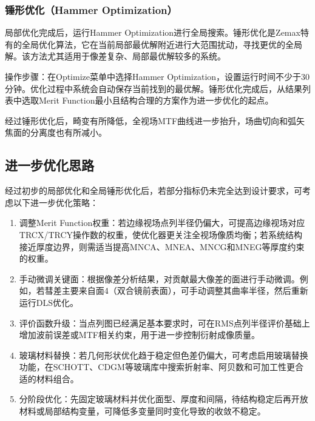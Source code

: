 \subsubsection{锤形优化（Hammer Optimization）}

局部优化完成后，运行Hammer Optimization进行全局搜索。锤形优化是Zemax特有的全局优化算法，它在当前局部最优解附近进行大范围扰动，寻找更优的全局解。该方法尤其适用于像差复杂、局部最优解较多的系统。

操作步骤：在Optimize菜单中选择Hammer Optimization，设置运行时间不少于30分钟。优化过程中系统会自动保存当前找到的最优解。锤形优化完成后，从结果列表中选取Merit Function最小且结构合理的方案作为进一步优化的起点。

经过锤形优化后，畸变有所降低，全视场MTF曲线进一步抬升，场曲切向和弧矢焦面的分离度也有所减小。

\subsection{进一步优化思路}

经过初步的局部优化和全局锤形优化后，若部分指标仍未完全达到设计要求，可考虑以下进一步优化策略：

\begin{enumerate}
\def\labelenumi{\arabic{enumi}.}
\item
  调整Merit Function权重：若边缘视场点列半径仍偏大，可提高边缘视场对应TRCX/TRCY操作数的权重，使优化器更关注全视场像质均衡；若系统结构接近厚度边界，则需适当提高MNCA、MNEA、MNCG和MNEG等厚度约束的权重。
\item
  手动微调关键面：根据像差分析结果，对贡献最大像差的面进行手动微调。例如，若彗差主要来自面4（双合镜前表面），可手动调整其曲率半径，然后重新运行DLS优化。
\item
  评价函数升级：当点列图已经满足基本要求时，可在RMS点列半径评价基础上增加波前误差或MTF相关约束，用于进一步控制衍射成像质量。
\item
  玻璃材料替换：若几何形状优化趋于稳定但色差仍偏大，可考虑启用玻璃替换功能，在SCHOTT、CDGM等玻璃库中搜索折射率、阿贝数和可加工性更合适的材料组合。
\item
  分阶段优化：先固定玻璃材料并优化面型、厚度和间隔，待结构稳定后再开放材料或局部结构变量，可降低多变量同时变化导致的收敛不稳定。
\end{enumerate}
